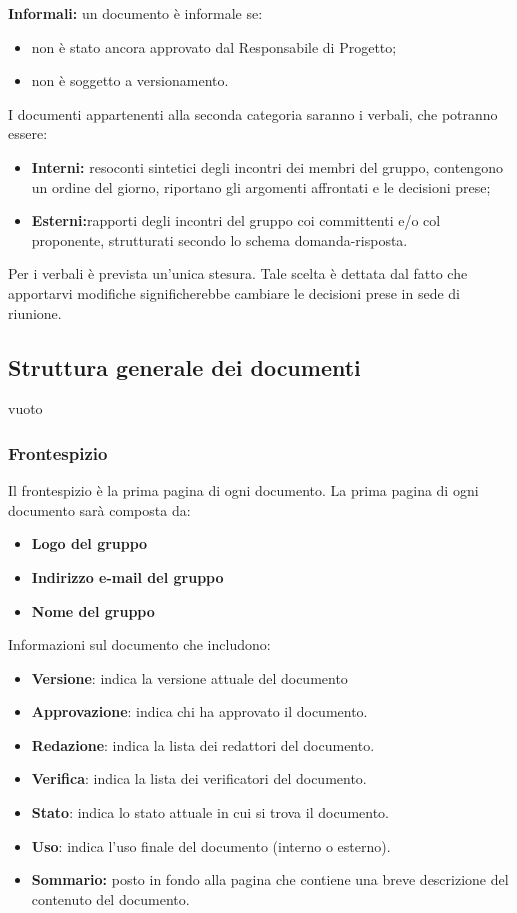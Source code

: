  \textbf{Informali:} un documento è informale se:
\begin{itemize}
\item non è stato ancora approvato dal Responsabile di Progetto;
	\item non è soggetto a versionamento.
\end{itemize}
I documenti appartenenti alla seconda categoria saranno i verbali, che potranno
essere:
\begin{itemize}
\item \textbf{Interni:} resoconti sintetici degli incontri dei membri del gruppo, contengono un ordine del giorno, riportano gli argomenti affrontati e le decisioni prese;
	\item \textbf{Esterni:}rapporti degli incontri del gruppo coi committenti e/o col proponente, strutturati secondo lo schema domanda-risposta.
\end{itemize}
Per i verbali è prevista un’unica stesura. Tale scelta è dettata dal fatto che apportarvi modifiche significherebbe cambiare le decisioni prese in sede di riunione.
\\
\subsection{Struttura generale dei documenti}
{vuoto}
\subsubsection{Frontespizio}
Il frontespizio è la prima pagina di ogni documento. 
La prima pagina di ogni documento sarà composta da:
\begin{itemize}
	\item \textbf{Logo del gruppo}
		\item \textbf{Indirizzo e-mail del gruppo}
			\item \textbf{Nome del gruppo}
\end{itemize}
Informazioni sul documento che includono:
\begin{itemize}
	\item \textbf{Versione}: indica la versione attuale del documento
		\item \textbf{Approvazione}: indica chi ha approvato il documento.
			\item \textbf{Redazione}: indica la lista dei redattori del documento.
				\item \textbf{Verifica}: indica la lista dei verificatori del documento. 
					\item \textbf{Stato}: indica lo stato attuale in cui si trova il documento.
						\item \textbf{Uso}: indica l’uso finale del documento (interno o esterno). 
							\item \textbf{Sommario:} posto in fondo alla pagina che contiene una breve descrizione del contenuto del documento.
\end{itemize}
